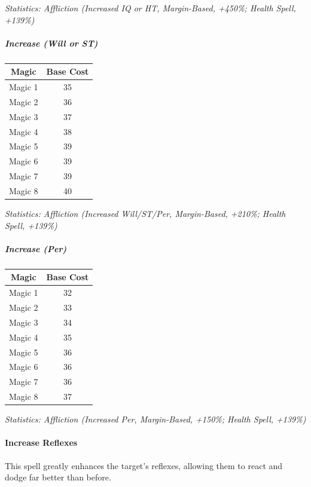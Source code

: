 \begin{multicols*}{3}
	\textcolor{OliveGreen}{\textit{Statistics: Affliction (Increased IQ or HT, Margin-Based, +450\%; Health Spell, +139\%) }}
	
	\subparagraph{Increase (Will or ST)}
	
	\begin{center}
		\begin{tabular}{|c|c|}
			\hline
			Magic & Base Cost \\
			\hline
			\hline
			Magic 1 & 35 \\
			Magic 2 & 36 \\
			Magic 3 & 37 \\
			Magic 4 & 38 \\
			Magic 5 & 39 \\
			Magic 6 & 39 \\
			Magic 7 & 39 \\
			Magic 8 & 40 \\
			\hline
		\end{tabular}
	\end{center}	
	
	\textcolor{OliveGreen}{\textit{Statistics: Affliction (Increased Will/ST/Per, Margin-Based, +210\%; Health Spell, +139\%) }}
	
	
	\subparagraph{Increase (Per)}
	
	\begin{center}
		\begin{tabular}{|c|c|}
			\hline
			Magic & Base Cost \\
			\hline
			\hline
			Magic 1 & 32 \\
			Magic 2 & 33 \\
			Magic 3 & 34 \\
			Magic 4 & 35 \\
			Magic 5 & 36 \\
			Magic 6 & 36 \\
			Magic 7 & 36 \\
			Magic 8 & 37 \\
			\hline
		\end{tabular}
	\end{center}	
	
	\textcolor{OliveGreen}{\textit{Statistics: Affliction (Increased Per, Margin-Based, +150\%; Health Spell, +139\%) }}
	
	\paragraph{Increase Reflexes}
	
	This spell greatly enhances the target's reflexes, allowing them to react and dodge far better than before.
	

\end{multicols*}
